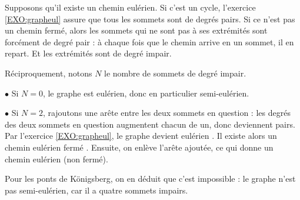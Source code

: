 \begin{Soln}{91}
Supposons qu'il existe un chemin eulérien. Si c'est un cycle, l'exercice \ref{EXO:grapheul} assure que
tous les sommets sont de degrés pairs. Si ce n'est pas un chemin fermé, alors les sommets qui ne sont pas à ses extrémités sont forcément de degré pair : à chaque fois que le chemin arrive en un sommet, il en repart. Et les extrémités sont de degré impair.

Réciproquement, notons $N$ le nombre de sommets de degré impair.

$\bullet$ Si $N=0$, le graphe est eulérien, donc en particulier semi-eulérien.

$\bullet$ Si $N=2$, rajoutons une arête entre les deux sommets en question : les degrés des deux sommets en question augmentent chacun de  un, donc deviennent pairs. Par l'exercice \ref{EXO:grapheul}, le graphe devient eulérien . Il existe alors un chemin eulérien fermé . Ensuite, on enlève l'arête ajoutée, ce qui donne un chemin eulérien (non fermé).

Pour les ponts de Königsberg, on en déduit que c'est impossible : le graphe n'est pas semi-eulérien, car il a quatre sommets impairs.

%
%
\end{Soln}
